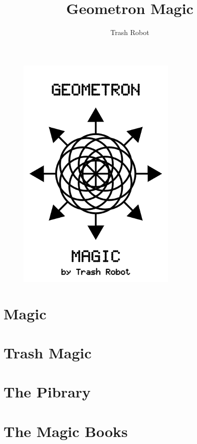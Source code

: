 \documentclass[ebook,12pt,openany]{memoir} %
\title{Geometron Magic}
\author{Trash Robot}
\begin{document}
\frontmatter
\begin{figure}[htbp]
\centering
\includegraphics[width=3in]{cover.png}
\end{figure}

\clearpage

\clearpage

\newpage
\thispagestyle{empty}
\mbox{}

\maketitle

\tableofcontents

\listoffigures 

%

\mainmatter

\chapter{Magic}

\chapter{Trash Magic}

\chapter{The Pibrary}

\chapter{The Magic Books}

\end{document}
